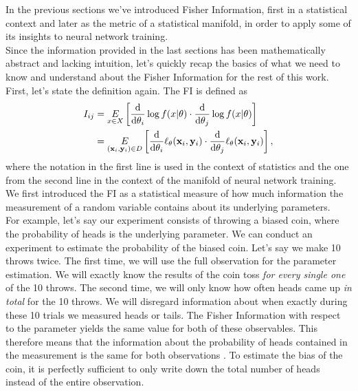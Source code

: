In the previous sections we've introduced Fisher Information, first in a statistical context and later as the metric of a statistical manifold, in order to apply some of its insights to neural network training.\\
Since the information provided in the last sections has been mathematically abstract and lacking intuition, let's quickly recap the basics of what we need to know and understand about the Fisher Information for the rest of this work.\\
First, let's state the definition again. The FI is defined as 
\begin{equation}
	\begin{split}
		I_{ij} &= \underset{x \in X}{E} \left[\frac{\mathrm{d}}{\mathrm{d}\theta_i}\log f(x|\theta)\cdot \frac{\mathrm{d}}{\mathrm{d}\theta_j}\log f(x|\theta)\right]\\
		&= \underset{(\mathbf{x}_i,\mathbf{y}_i)\in D}{E} \left[\frac{\mathrm{d}}{\mathrm{d}\theta_i}\ell_\theta(\mathbf{x}_i,\mathbf{y}_i)\cdot \frac{\mathrm{d}}{\mathrm{d}\theta_j}\ell_\theta(\mathbf{x}_i,\mathbf{y}_i)\right],
	\end{split}
\end{equation}
where the notation in the first line is used in the context of statistics and the one from the second line in the context of the manifold of neural network training.\\
We first introduced the FI as a statistical measure of how much information the measurement of a random variable contains about its underlying parameters.\\
For example, let's say our experiment consists of throwing a biased coin, where the probability of heads is the underlying parameter. We can conduct an experiment to estimate the probability of the biased coin. Let's say we make 10 throws twice. The first time, we will use the full observation for the parameter estimation. We will exactly know the results of the coin toss \emph{for every single one} of the 10 throws. The second time, we will only know how often heads came up \emph{in total} for the 10 throws. We will disregard information about when exactly during these 10 trials we measured heads or tails. The Fisher Information with respect to the parameter yields the same value for both of these observables. This therefore means that the information about the probability of heads contained in the measurement is the same for both observations \cite{StatisticFisherInfoTutorial}. To estimate the bias of the coin, it is perfectly sufficient to only write down the total number of heads instead of the entire observation.\\
